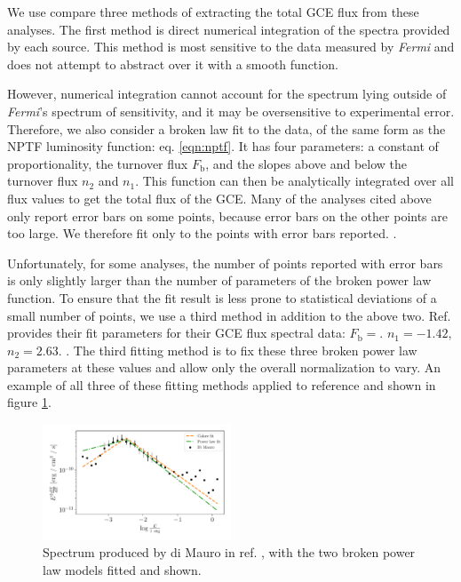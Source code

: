 \documentclass[a4paper,11pt]{article}
\newcommand{\comment}[1]{\emph{\color{red}{#1}}}
\begin{document}
\comment{Describe the sources: what's similar between them, what's different.}

We use compare three methods of extracting the total GCE flux from these analyses.
The first method is direct numerical integration of the spectra provided by each source. This method is most sensitive to the data measured by \textit{Fermi} and does not attempt to abstract over it with a smooth function.

However, numerical integration cannot account for the spectrum lying outside of \textit{Fermi}'s spectrum of sensitivity, and it may be oversensitive to experimental error. Therefore, we also consider a broken law fit to the data, of the same form as the NPTF luminosity function: eq. \ref{eqn:nptf}. It has four parameters: a constant of proportionality, the turnover flux $F_\text{b}$, and the slopes above and below the turnover flux $n_2$ and $n_1$. This function can then be analytically integrated over all flux values to get the total flux of the GCE. Many of the analyses cited above only report error bars on some points, because error bars on the other points are too large. We therefore fit only to the points with error bars reported. \comment{Mention the specific range fitted over}.

Unfortunately, for some analyses, the number of points reported with error bars is only slightly larger than the number of parameters of the broken power law function. To ensure that the fit result is less prone to statistical deviations of a small number of points, we use a third method in addition to the above two. Ref. \cite{Calore:2014xka} provides their fit parameters for their GCE flux spectral data: $F_\text{b} = $. $n_1 = -1.42$, $n_2 = 2.63$. \comment{Check for sign errors in the original. Also get the flux they provide.}. The third fitting method is to fix these three broken power law parameters at these values and allow only the overall normalization to vary. An example of all three of these fitting methods applied to reference \cite{DiMauro:2021raz} and shown in figure \ref{fig:di-mauro-example}.

\begin{figure}
    \centering
    \includegraphics[width=0.5\textwidth]{figs/di-mauro-example.pdf}
    \caption{Spectrum produced by di Mauro in ref. \cite{DiMauro:2021raz}, with the two broken power law models fitted and shown.}
    \label{fig:di-mauro-example}
\end{figure}
\end{document}
